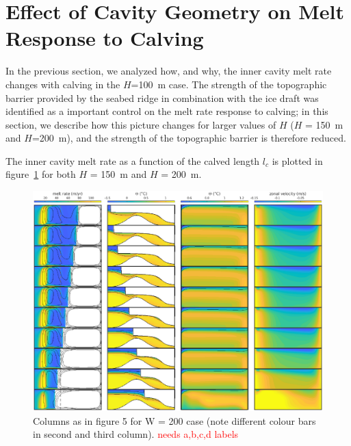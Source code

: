 \documentclass[draft]{agujournal2019}
\newcommand{\red}[1]{\textcolor{red}{#1}}
\begin{document}
\section{Effect of Cavity Geometry on Melt Response to Calving}\label{S:Results:H}
In the previous section, we analyzed how, and why, the inner cavity melt rate changes with calving in the $H$=100~m case. The strength of the topographic barrier provided by the seabed ridge in combination with the ice draft was identified as a important control on the melt rate response to calving; in this section, we describe how this picture changes for larger values of $H$ ($H$ = 150~m and $H$=200~m), and the strength of the topographic barrier is therefore reduced.

The inner cavity melt rate as a function of the calved length $l_c$ is plotted in figure~\ref{fig:figure7} for both $H$ = 150~m and $H$ = 200~m.
\begin{figure}
    \centering
    \includegraphics[width = \textwidth]{../make_figures/plots/figure7.eps}
    \caption{Columns as in figure 5 for W = 200 case (note different colour bars in second and third column). \red{needs a,b,c,d labels}}
    \label{fig:figure7}
\end{figure}
\end{document}
